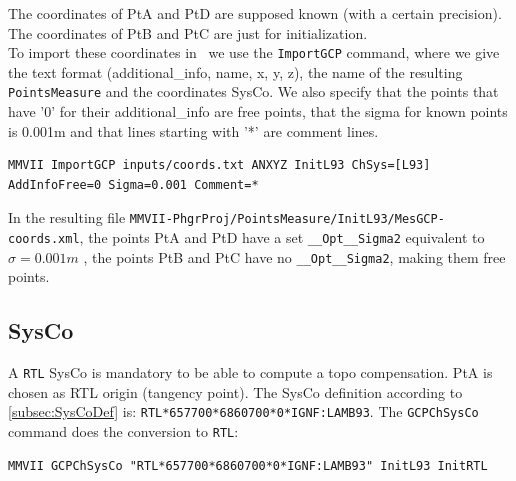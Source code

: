 The coordinates of PtA and PtD are supposed known (with a certain precision).
The coordinates of PtB and PtC are just for initialization.
\\

To import these coordinates in \CdPPP\ we use the \texttt{ImportGCP} command, where we give the text format
(additional\_info, name, x, y, z), the name of the resulting \texttt{PointsMeasure} and the coordinates SysCo.
We also specify that the points that have '0' for their additional\_info are free points, that the sigma for
known points is 0.001m and that lines starting with '*' are comment lines.

\begin{lstlisting}
MMVII ImportGCP inputs/coords.txt ANXYZ InitL93 ChSys=[L93] AddInfoFree=0 Sigma=0.001 Comment=*
\end{lstlisting}

In the resulting file \texttt{MMVII-PhgrProj/PointsMeasure/InitL93/MesGCP-coords.xml},
the points PtA and PtD have a set \texttt{\_\_Opt\_\_Sigma2} equivalent to $\sigma = 0.001 m$ ,
the points PtB and PtC have no \texttt{\_\_Opt\_\_Sigma2}, making them free points.


\subsection{SysCo}

A \texttt{RTL} SysCo is mandatory to be able to compute a topo compensation.
PtA is chosen as RTL origin (tangency point).
The SysCo definition according to \ref{subsec:SysCoDef} is: \texttt{RTL*657700*6860700*0*IGNF:LAMB93}.
The \texttt{GCPChSysCo} command does the conversion to \texttt{RTL}:

\begin{lstlisting}
MMVII GCPChSysCo "RTL*657700*6860700*0*IGNF:LAMB93" InitL93 InitRTL
\end{lstlisting}

